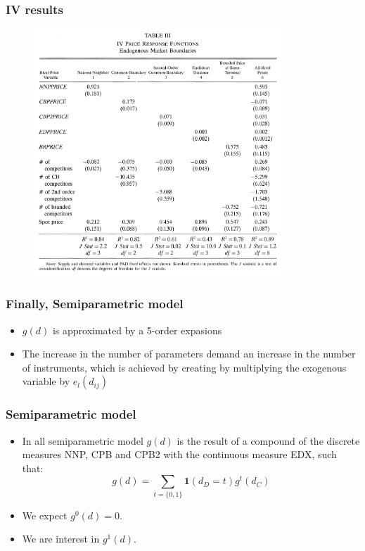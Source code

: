 \documentclass{beamer}
\begin{document}
\begin{frame}
  \frametitle{IV results}
  \vspace{-0.6cm}
  \begin{figure}
    \includegraphics[width=\linewidth, height=9.3cm]{IV_res.png}
  \end{figure}
\end{frame}

\begin{frame}
  \frametitle{Finally, Semiparametric model}

  \begin{itemize}
    \item $g(d)$ is approximated by a 5-order expasions
    \item The increase in the number of parameters demand an increase in the number of instruments, which is achieved by creating by multiplying the exogenous variable by $e_l(d_{ij})$

  \end{itemize}
\end{frame}

\begin{frame}
  \frametitle{Semiparametric model}
  
  \begin{itemize}
    \item In all semiparametric model $g(d)$ is the result of a compound of the discrete measures NNP, CPB and CPB2 with the continuous measure EDX, such that:
      \[ g(d) = \sum_{t = \{0,1\}} \textbf{1}(d_D = t)g^t(d_C) \]
    \item We expect $g^0(d) = 0$.
    \item We are interest in $g^1(d)$.
  \end{itemize}
\end{frame}
\end{document}
